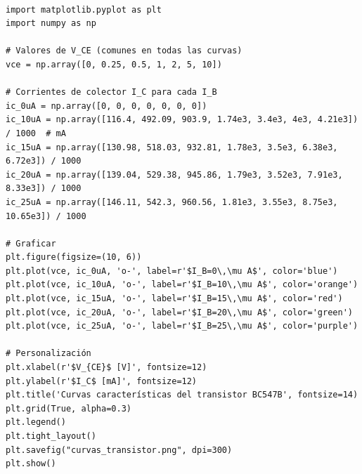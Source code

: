 \begin{verbatim}

import matplotlib.pyplot as plt
import numpy as np

# Valores de V_CE (comunes en todas las curvas)
vce = np.array([0, 0.25, 0.5, 1, 2, 5, 10])

# Corrientes de colector I_C para cada I_B
ic_0uA = np.array([0, 0, 0, 0, 0, 0, 0])
ic_10uA = np.array([116.4, 492.09, 903.9, 1.74e3, 3.4e3, 4e3, 4.21e3]) / 1000  # mA
ic_15uA = np.array([130.98, 518.03, 932.81, 1.78e3, 3.5e3, 6.38e3, 6.72e3]) / 1000
ic_20uA = np.array([139.04, 529.38, 945.86, 1.79e3, 3.52e3, 7.91e3, 8.33e3]) / 1000
ic_25uA = np.array([146.11, 542.3, 960.56, 1.81e3, 3.55e3, 8.75e3, 10.65e3]) / 1000

# Graficar
plt.figure(figsize=(10, 6))
plt.plot(vce, ic_0uA, 'o-', label=r'$I_B=0\,\mu A$', color='blue')
plt.plot(vce, ic_10uA, 'o-', label=r'$I_B=10\,\mu A$', color='orange')
plt.plot(vce, ic_15uA, 'o-', label=r'$I_B=15\,\mu A$', color='red')
plt.plot(vce, ic_20uA, 'o-', label=r'$I_B=20\,\mu A$', color='green')
plt.plot(vce, ic_25uA, 'o-', label=r'$I_B=25\,\mu A$', color='purple')

# Personalización
plt.xlabel(r'$V_{CE}$ [V]', fontsize=12)
plt.ylabel(r'$I_C$ [mA]', fontsize=12)
plt.title('Curvas características del transistor BC547B', fontsize=14)
plt.grid(True, alpha=0.3)
plt.legend()
plt.tight_layout()
plt.savefig("curvas_transistor.png", dpi=300)
plt.show()

\end{verbatim}

\valentinoPoneLasColumnas{}
